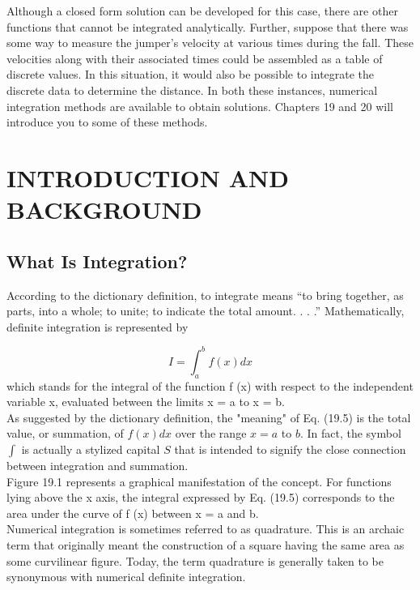\documentclass[../main.tex]{subfiles}
\begin{document}
Although a closed form solution can be developed for this case, there are other functions that cannot be integrated analytically. Further, suppose that there was some way to
measure the jumper's velocity at various times during the fall. These velocities along with
their associated times could be assembled as a table of discrete values. In this situation, it
would also be possible to integrate the discrete data to determine the distance. In both these
instances, numerical integration methods are available to obtain solutions. Chapters 19 and
20 will introduce you to some of these methods.

\section{INTRODUCTION AND BACKGROUND}

\subsection{What Is Integration?}

According to the dictionary definition, to integrate means “to bring together, as parts, into
a whole; to unite; to indicate the total amount. . . .” Mathematically, definite integration is
represented by

\begin{equation}
	\tag{19.5}
	I=\int_{a}^{b} f(x) d x
	\end{equation}
	which stands for the integral of the function f (x) with respect to the independent variable
	x, evaluated between the limits x = a to x = b.\\
	\>As suggested by the dictionary definition, the "meaning" of Eq. (19.5) is the total value, or summation, of $f(x) d x$ over the range $x=a$ to $b$. In fact, the symbol $\int$ is actually a stylized capital $S$ that is intended to signify the close connection between integration and summation.
	\\\>Figure 19.1 represents a graphical manifestation of the concept. For functions lying
	above the x axis, the integral expressed by Eq. (19.5) corresponds to the area under the
	curve of f (x) between x = a and b.\\
	\>Numerical integration is sometimes referred to as quadrature. This is an archaic term
that originally meant the construction of a square having the same area as some curvilinear
figure. Today, the term quadrature is generally taken to be synonymous with numerical
definite integration. 
\end{document}
